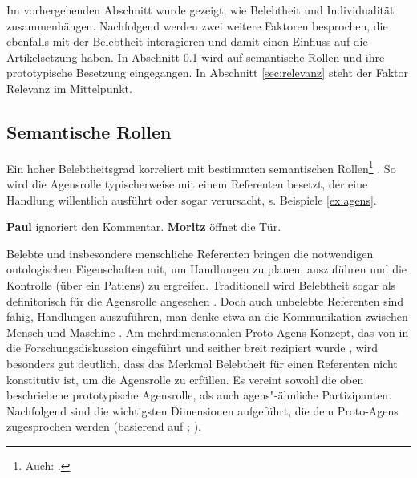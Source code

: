 Im vorhergehenden Abschnitt wurde gezeigt, wie Belebtheit und Individualität zusammenhängen. Nachfolgend werden zwei weitere Faktoren besprochen, die ebenfalls mit der Belebtheit interagieren und damit einen Einfluss auf die Artikelsetzung haben. In Abschnitt \ref{sec:partizipanten} wird auf semantische Rollen und ihre prototypische Besetzung eingegangen. In Abschnitt \ref{sec:relevanz} steht der Faktor Relevanz im Mittelpunkt.
 
\subsection{Semantische Rollen}\label{sec:partizipanten}

Ein hoher Belebtheitsgrad korreliert mit bestimmten semantischen Rollen\footnote{Auch:  \parencite[vgl.][]{Lehmann2004a}.} \parencite[vgl. u.a.][]{Hopper1980,Comrie1989,Yamamoto2006}. So wird die Agensrolle typischerweise mit einem Referenten besetzt, der eine Handlung willentlich ausführt oder sogar verursacht, s. Beispiele \ref{ex:agens}.

\begin{exe}
	\ex \label{ex:agens}
	\begin{xlist}
		\ex \label{ex:voll} \textbf{Paul} ignoriert den Kommentar. 
 		\ex \label{ex:verursacher} \textbf{Moritz} öffnet die Tür.
	\end{xlist}
\end{exe}

\noindent 
Belebte und insbesondere menschliche Referenten bringen die notwendigen ontologischen Eigenschaften mit, um Handlungen zu planen,  auszuführen und die Kontrolle (über ein Patiens) zu ergreifen. Traditionell wird Belebtheit sogar als definitorisch für die Agensrolle angesehen \parencite[16]{Primus2012}. 
Doch auch unbelebte Referenten sind fähig, Handlungen auszuführen, man denke etwa an die  Kommunikation zwischen Mensch und Maschine \parencite[s. weiterführend][18]{Primus2012}. Am mehrdimensionalen Proto-Agens-Konzept, das von \parencite{Dowty1991} in die Forschungsdiskussion eingeführt und seither breit rezipiert wurde \parencite[vgl. u.a.][]{Ackermann2001,Primus2012,Szczepaniak2016}, wird besonders gut deutlich, dass das Merkmal Belebtheit für einen Referenten nicht konstitutiv ist, um die Agensrolle zu erfüllen. Es vereint sowohl die oben beschriebene prototypische Agensrolle, als auch agens"-ähnliche Partizipanten. Nachfolgend sind die wichtigsten Dimensionen aufgeführt, die dem Proto-Agens zugesprochen werden  (basierend auf \cite[][572f.]{Dowty1991};   \cite[25]{Primus2012}).  

